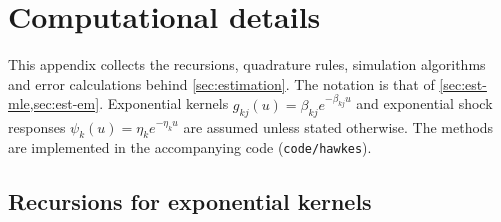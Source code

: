 \section{Computational details}\label{app:computation}

This appendix collects the recursions, quadrature rules, simulation algorithms and error
calculations behind \cref{sec:estimation}. The notation is that of
\cref{sec:est-mle,sec:est-em}. Exponential kernels
$g_{kj}(u)=\beta_{kj}e^{-\beta_{kj}u}$ and exponential shock responses
$\psi_k(u)=\eta_ke^{-\eta_ku}$ are assumed unless stated otherwise. The methods are
implemented in the accompanying code (\texttt{code/hawkes}).

\subsection{Recursions for exponential kernels}\label{app:comp-rec}

